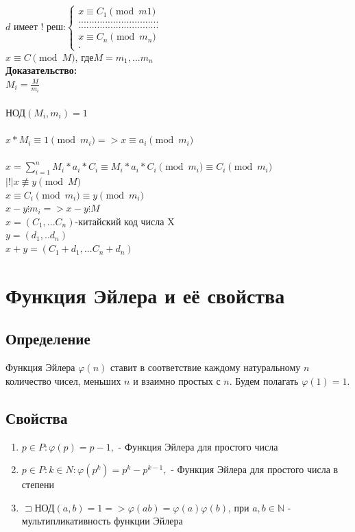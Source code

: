 \documentclass[12pt]{article}
\renewcommand{\gcd}{\text{НОД}}
\begin{document}
    $
        d \text{ имеет ! реш:}\left\{
        \begin{aligned}
            x \equiv C_1 \pmod{m1}         \\
            .............................. \\
            .............................. \\
            x \equiv C_n \pmod{m_n}        \\.
        \end{aligned}
        \right.
    $\\
    $x\equiv C\pmod{M} $, где$M = m_1,...m_n$\\

    \textbf{Доказательство:}\\
    $M_i=\frac{M}{m_i}$\\
    \\
    $\gcd(M_i, m_i) = 1 $\\
    \\
    $x*M_i\equiv 1\pmod{m_i} => x\equiv a_i\pmod{m_i} $\\
    \\
    $x = \sum_{i=1}^{n} M_i*a_i*C_i\equiv M_i*a_i*C_i\pmod{m_i}\equiv C_i\pmod{m_i} $\\
    $|!| x \not\equiv y \pmod{M} $\\
    $x\equiv C_i\pmod{m_i}\equiv y\pmod{m_i}$\\
    $x-y\vdots m_i => x-y\vdots M$\\
    $x = (C_1,...C_n)$-китайский код числа X\\
    $y = (d_1,..d_n)$\\
    $x+y = (C_1+d_1,...C_n+d_n)$

    \setcounter{section}{7}

    \section{Функция Эйлера и её свойства}

    \subsection{Определение} Функция Эйлера $\varphi(n)$ ставит в соответствие каждому натуральному $n$ количество чисел, меньших $n$ и взаимно простых с $n$. Будем полагать $\varphi(1)=1$.

    \subsection{Свойства}
    \begin{enumerate}
        \item $p\in P:\varphi(p)=p-1,$ - Функция Эйлера для простого числа
        \item $p\in P:k\in N:\varphi(p^{k})=p^{k}-p^{k-1},$ - Функция Эйлера для простого числа в степени
        \item $\sqsupset$НОД$(a,b)=1=>\varphi(ab)=\varphi(a)\varphi(b)$, при $a,b\in \mathbb{N}$ - мультипликативность функции Эйлера
    \end{enumerate}
\end{document}
